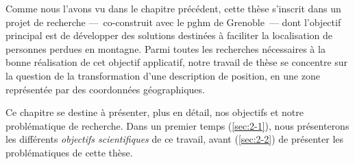 Comme nous l'avons vu dans le chapitre précédent, cette thèse
s'inscrit dans un projet de recherche ---~co-construit avec le
\ac{pghm} de Grenoble~--- dont l'objectif principal est de développer
des solutions destinées à faciliter la localisation de personnes
perdues en montagne. Parmi toutes les recherches nécessaires à la
bonne réalisation de cet objectif applicatif, notre travail de thèse
se concentre sur la question de la transformation d'une description de
position, en une zone représentée par des coordonnées géographiques.

Ce chapitre se destine à présenter, plus en détail, nos objectifs et
notre problématique de recherche. Dans un premier temps
(\autoref{sec:2-1}), nous présenterons les différents \emph{objectifs
  scientifiques} de ce travail, avant (\autoref{sec:2-2}) de présenter
les problématiques de cette thèse.

